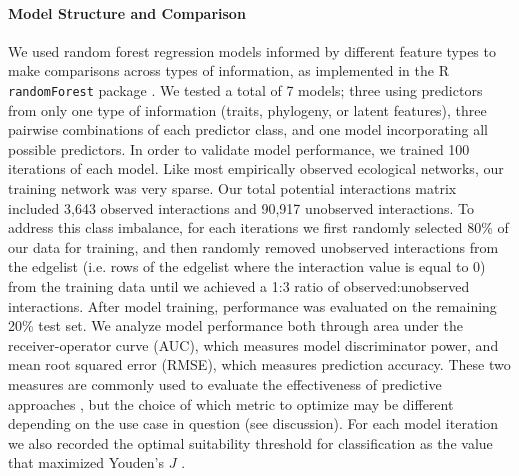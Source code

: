 \paragraph{Model Structure and Comparison} We used random forest regression models informed by different feature types to make comparisons across types of information, as implemented in the R \texttt{randomForest} package \cite{randomForest}. We tested a total of 7 models; three using predictors from only one type of information (traits, phylogeny, or latent features), three pairwise combinations of each predictor class, and one model incorporating all possible predictors. In order to validate model performance, we trained 100 iterations of each model. Like most empirically observed ecological networks, our training network was very sparse\cite{vazquez2009uniting}. Our total potential interactions matrix included 3,643 observed interactions and 90,917 unobserved interactions. To address this class imbalance, for each iterations we first randomly selected 80\% of our data for training, and then randomly removed unobserved interactions from the edgelist (i.e. rows of the edgelist where the interaction value is equal to 0) from the training data until we achieved a 1:3 ratio of observed:unobserved interactions. After model training, performance was evaluated on the remaining 20\% test set. We analyze model performance both through area under the receiver-operator curve (AUC), which measures model discriminator power, and mean root squared error (RMSE), which measures prediction accuracy. These two measures are commonly used to evaluate the effectiveness of predictive approaches \cite{norberg2019comprehensive}, but the choice of which metric to optimize may be different depending on the use case in question (see discussion). For each model iteration we also recorded the optimal suitability threshold for classification as the value that maximized Youden's $J$ \cite{youden1950index}.


